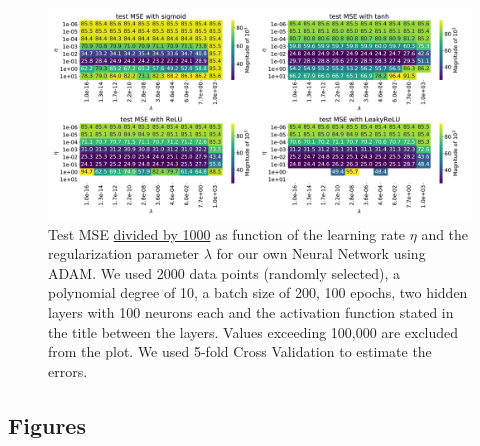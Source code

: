\documentclass[11pt,a4paper,titlepage]{article}
\begin{document}
\begin{figure}[H]
\centering
\includegraphics[width=1.0\textwidth]{2_layers_short.pdf}
\caption[4 hidden layers, 100 epochs]{Test MSE \underline{divided by 1000} as function of the learning rate $\eta$ and the regularization parameter $\lambda$ for our own Neural Network using ADAM. We used 2000 data points (randomly selected), a polynomial degree of 10, a batch size of 200, 100 epochs, two hidden layers with 100 neurons each and the activation function stated in the title between the layers. Values exceeding 100,000 are excluded from the plot. We used 5-fold Cross Validation to estimate the errors.} \label{fig:2layers}
\end{figure}

\subsection{Figures}


\end{document}
